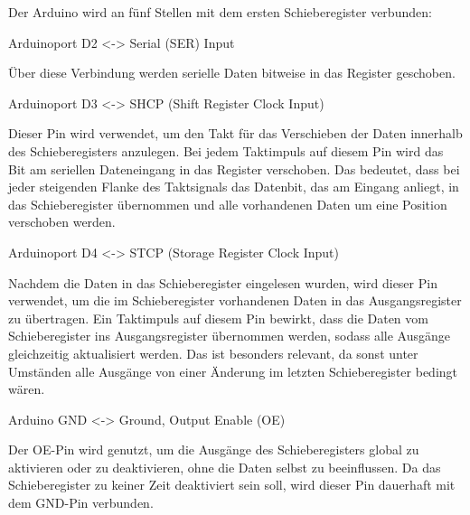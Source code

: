 Der Arduino wird an fünf Stellen mit dem ersten Schieberegister verbunden:

Arduinoport D2 <-> Serial (SER) Input

Über diese Verbindung werden serielle Daten bitweise in das Register geschoben. %

Arduinoport D3 <-> SHCP (Shift Register Clock Input)

Dieser Pin wird verwendet, um den Takt für das Verschieben der Daten innerhalb des Schieberegisters anzulegen.
Bei jedem Taktimpuls auf diesem Pin wird das Bit am seriellen Dateneingang in das Register verschoben.
Das bedeutet, dass bei jeder steigenden Flanke des Taktsignals das Datenbit, das am Eingang anliegt, in das Schieberegister übernommen und alle vorhandenen Daten um eine Position verschoben werden.

Arduinoport D4 <-> STCP (Storage Register Clock Input)

Nachdem die Daten in das Schieberegister eingelesen wurden, wird dieser Pin verwendet, um die im Schieberegister vorhandenen Daten in das Ausgangsregister zu übertragen.
Ein Taktimpuls auf diesem Pin bewirkt, dass die Daten vom Schieberegister ins Ausgangsregister übernommen werden, sodass alle Ausgänge gleichzeitig aktualisiert werden.
Das ist besonders relevant, da sonst unter Umständen alle Ausgänge von einer Änderung im letzten Schieberegister bedingt wären. %

Arduino GND <-> Ground, Output Enable (OE)

Der OE-Pin wird genutzt, um die Ausgänge des Schieberegisters global zu aktivieren oder zu deaktivieren, ohne die Daten selbst zu beeinflussen.
Da das Schieberegister zu keiner Zeit deaktiviert sein soll, wird dieser Pin dauerhaft mit dem GND-Pin verbunden.

